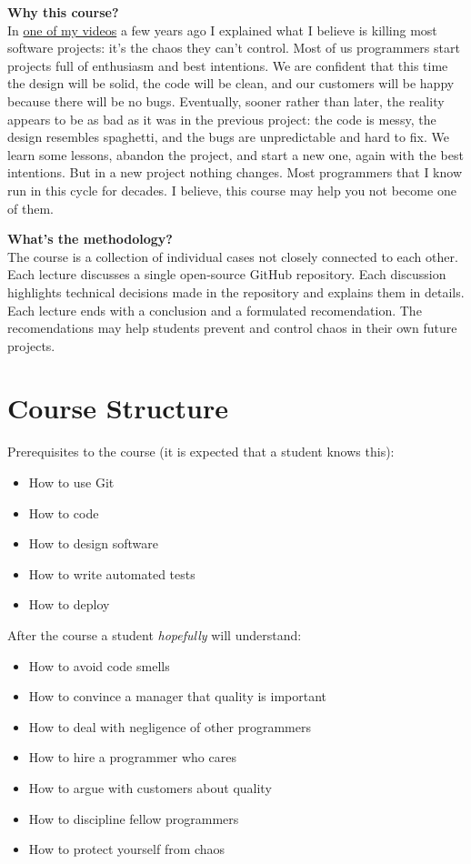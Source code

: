 \documentclass[nobrand,anonymous,nodate,nosecurity]{huawei}
\begin{document}
{\textbf{Why this course?}\\
In \href{https://www.youtube.com/watch?v=kPmbRkSWYnY}{one of my videos}
a few years ago I explained what I believe is killing
most software projects: it's the chaos they can't control. Most of us
programmers start projects full of enthusiasm and best intentions.
We are confident that this time the design will be solid, the code will
be clean, and our customers will be happy because there will be no bugs.
Eventually, sooner rather than later, the reality appears to be as bad
as it was in the previous project: the code is messy, the design resembles
spaghetti, and the bugs are unpredictable and hard to fix. We learn some
lessons, abandon the project, and start a new one, again with the best
intentions. But in a new project nothing changes.
Most programmers that I know run in this cycle for decades.
I believe, this course may help you not become one of them.

\textbf{What's the methodology?}\\
The course is a collection of individual cases not
closely connected to each other. Each lecture discusses a single open-source
GitHub repository. Each discussion highlights technical decisions made in the
repository and explains them in details. Each lecture ends with a conclusion
and a formulated recomendation. The recomendations may help students
prevent and control chaos in their own future projects.

\newpage
\section*{Course Structure}

Prerequisites to the course (it is expected that a student knows this):

\begin{itemize}
\item How to use Git
\item How to code
\item How to design software
\item How to write automated tests
\item How to deploy
\end{itemize}

After the course a student \emph{hopefully} will understand:

\begin{itemize}
\item How to avoid code smells
\item How to convince a manager that quality is important
\item How to deal with negligence of other programmers
\item How to hire a programmer who cares
\item How to argue with customers about quality
\item How to discipline fellow programmers
\item How to protect yourself from chaos
\end{itemize}

}
\end{document}
